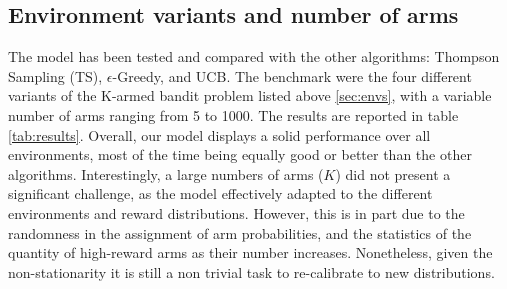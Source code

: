 \subsection{Environment variants and number of arms}

The model has been tested and compared with the other algorithms: Thompson Sampling (TS), $\epsilon$-Greedy, and UCB. The benchmark were the four different variants of the K-armed bandit problem listed above \ref{sec:envs}, with a variable number of arms ranging from 5 to 1000.
The results are reported in table \ref{tab:results}.
Overall, our model displays a solid performance over all environments, most of the time being equally good or better than the other algorithms.
Interestingly, a large numbers of arms ($K$) did not present a significant challenge, as the model effectively adapted to the different environments and reward distributions.
However, this is in part due to the randomness in the assignment of arm probabilities, and the statistics of the quantity of high-reward arms as their number increases. Nonetheless, given the non-stationarity it is still a non trivial task to re-calibrate to new distributions.


